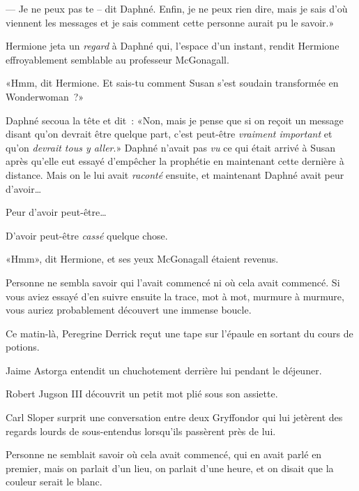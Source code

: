 --- Je ne peux pas te -- dit Daphné. Enfin, je ne peux rien dire, mais je sais d'où viennent les messages et je sais comment cette personne aurait pu le savoir.»

Hermione jeta un \emph{regard} à Daphné qui, l'espace d'un instant, rendit Hermione effroyablement semblable au professeur McGonagall.

«Hmm, dit Hermione. Et sais-tu comment Susan s'est soudain transformée en Wonderwoman~?»

Daphné secoua la tête et dit~: «Non, mais je pense que si on reçoit un message disant qu'on devrait être quelque part, c'est peut-être \emph{vraiment important} et qu'on \emph{devrait tous y aller}.» Daphné n'avait pas \emph{vu} ce qui était arrivé à Susan après qu'elle eut essayé d'empêcher la prophétie en maintenant cette dernière à distance. Mais on le lui avait \emph{raconté} ensuite, et maintenant Daphné avait peur d'avoir…

Peur d'avoir peut-être…

D'avoir peut-être \emph{cassé} quelque chose.

«Hmm», dit Hermione, et ses yeux McGonagall étaient revenus.

\later

Personne ne sembla savoir qui l'avait commencé ni où cela avait commencé. Si vous aviez essayé d'en suivre ensuite la trace, mot à mot, murmure à murmure, vous auriez probablement découvert une immense boucle.

Ce matin-là, Peregrine Derrick reçut une tape sur l'épaule en sortant du cours de potions.

Jaime Astorga entendit un chuchotement derrière lui pendant le déjeuner.

Robert Jugson III découvrit un petit mot plié sous son assiette.

Carl Sloper surprit une conversation entre deux Gryffondor qui lui jetèrent des regards lourds de sous-entendus lorsqu'ils passèrent près de lui.

Personne ne semblait savoir où cela avait commencé, qui en avait parlé en premier, mais on parlait d'un lieu, on parlait d'une heure, et on disait que la couleur serait le blanc.

\later

